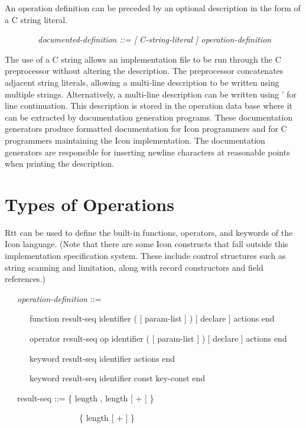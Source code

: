 An operation definition can be preceded by an optional description in
the form of a C string literal.

{\ttfamily\mdseries
\ \ \ \ \ \ \ \ \textit{documented-definition ::= [ C-string-literal ] operation-definition}}


The use of a C string allows an implementation file to be run through
the C preprocessor without altering the description. The preprocessor
concatenates adjacent string literals, allowing a multi-line
description to be written using multiple strings. Alternatively, a
multi-line description can be written using {\textasciigrave}' for
line continuation. This description is stored in the operation data
base where it can be extracted by documentation generation
programs. These documentation generators produce formatted
documentation for Icon programmers and for C programmers maintaining
the Icon implementation. The documentation generators are responsible
for inserting newline characters at reasonable points when printing
the description.

\section{Types of Operations }

Rtt can be used to define the built-in functions, operators, and
keywords of the Icon language. (Note that there are some Icon
constructs that fall outside this implementation specification
system. These include control structures such as string scanning and
limitation, along with record constructors and field references.)

{\ttfamily\mdseries
\ \ \ \textit{operation-definition} ::=}

{\ttfamily\mdseries
\ \ \ \ \ \ function result-seq identifier ( [ param-list ] ) [ declare ] actions end {\textbar}}

{\ttfamily\mdseries
\ \ \ \ \ \ operator result-seq op identifier ( [ param-list ] ) [ declare ] actions end {\textbar}}

{\ttfamily\mdseries
\ \ \ \ \ \ keyword result-seq identifier actions end {\textbar}}

{\ttfamily\mdseries
\ \ \ \ \ \ keyword result-seq identifier const key-const end}

{\ttfamily\mdseries
\ \ \ result-seq ::= \{ length , length [ + ] \} {\textbar}}

{\ttfamily\mdseries
\ \ \ \ \ \ \ \ \ \ \ \ \ \ \ \ \ \ \{ length [ + ] \} {\textbar}}

